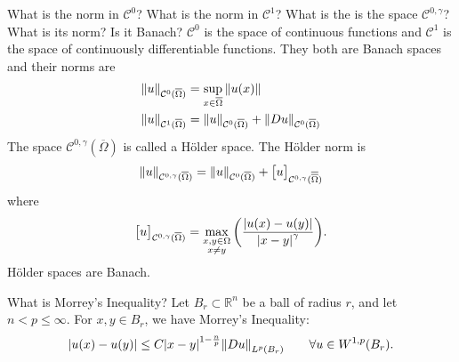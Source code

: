 \documentclass[avery5388,grid,frame]{flashcards}
\def\Rl{\mathbb{R}}
\begin{document}
\begin{flashcard}
    {What is the norm in $\mathcal{C}^0$?  What is the norm in $\mathcal{C}^1$?  What is the is the space $\mathcal{C}^{0,\gamma}$?  What is its norm?  Is it Banach?}
    $\mathcal{C}^0$ is the space of continuous functions and $\mathcal{C}^1$ is the space of continuously differentiable functions.  They both are Banach spaces and their norms are
    \begin{equation*}
        \begin{aligned}
            \norm{u}_{\mathcal{C}^0(\overline{\Omega})} &= \sup_{x\in\overline{\Omega}}\norm{u(x)} \\
            \norm{u}_{\mathcal{C}^1(\overline{\Omega})} &= \norm{u}_{\mathcal{C}^0(\overline{\Omega})} + \norm{Du}_{\mathcal{C}^0(\overline{\Omega})}
        \end{aligned}
    \end{equation*}
    The space $\mathcal{C}^{0,\gamma}(\overline{\Omega})$ is called a H\"{o}lder space.  The H\"{o}lder norm is
    \vspace{-.2cm}
    \begin{align*}
        \norm{u}_{\mathcal{C}^{0,\gamma}(\overline{\Omega})} = \norm{u}_{\mathcal{C}^0(\overline{\Omega})} + \big[u\big]_{\mathcal{C}^{0,\gamma}(\overline{\overline{\Omega}})}
    \end{align*}
    where
    \vspace{-.2cm}
    \begin{align*}
        \big[u\big]_{\mathcal{C}^{0,\gamma}(\overline{\Omega})} = \max_{\substack{x,y\in\Omega\\x\neq y}}\qty(\frac{\abs{u(x) - u(y)}}{\abs{x - y}^\gamma}).
    \end{align*}
    \vspace{-.2cm}
    H\"{o}lder spaces are Banach.
\end{flashcard}

\begin{flashcard}
    {What is Morrey's Inequality?}
    Let $B_r\subset\Rl^n$ be a ball of radius $r$, and let $n < p \leq \infty$.  For $x,y\in B_r$, we have Morrey's Inequality:
    \begin{align*}
        \abs{u(x) - u(y)} \leq C\abs{x - y}^{1 - \frac{n}{p}}\norm{Du}_{L^p(B_r)} \qquad \forall u \in W^{1,p}(B_r).
    \end{align*}
\end{flashcard}
\end{document}
